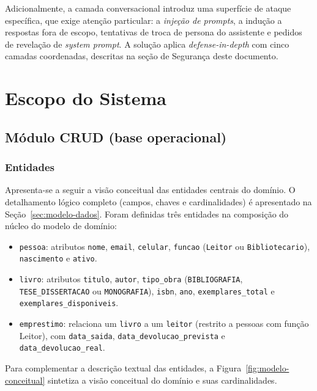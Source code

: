 \documentclass[monografia,abnt]{inf-ufg-modificado}
\begin{document}
Adicionalmente, a camada conversacional introduz uma superfície de ataque específica, que exige atenção particular: a \textit{injeção de prompts}, a indução a respostas fora de escopo, tentativas de troca de persona do assistente e pedidos de revelação de \textit{system prompt}. A solução aplica \textit{defense-in-depth} com cinco camadas coordenadas, descritas na seção de Segurança deste documento.

\chapter{Escopo do Sistema}

\section{Módulo CRUD (base operacional)}

\subsection{Entidades}

Apresenta-se a seguir a visão conceitual das entidades centrais do domínio. O detalhamento lógico completo (campos, chaves e cardinalidades) é apresentado na Seção~\ref{sec:modelo-dados}. Foram definidas três entidades na composição do núcleo do modelo de domínio:

\begin{itemize}
    \item \texttt{pessoa}: atributos \texttt{nome}, \texttt{email}, \texttt{celular}, \texttt{funcao} (\texttt{Leitor} ou \texttt{Bibliotecario}), \texttt{nascimento} e \texttt{ativo}.
    \item \texttt{livro}: atributos \texttt{titulo}, \texttt{autor}, \texttt{tipo\_obra} (\texttt{BIBLIOGRAFIA}, \texttt{TESE\_DISSERTACAO} ou \texttt{MONOGRAFIA}), \texttt{isbn}, \texttt{ano}, \texttt{exemplares\_total} e \texttt{exemplares\_disponiveis}.
    \item \texttt{emprestimo}: relaciona um \texttt{livro} a um \texttt{leitor} (restrito a pessoas com função Leitor), com \texttt{data\_saida}, \texttt{data\_devolucao\_prevista} e \texttt{data\_devolucao\_real}.
\end{itemize}

Para complementar a descrição textual das entidades, a Figura~\ref{fig:modelo-conceitual} sintetiza a visão conceitual do domínio e suas cardinalidades.
\end{document}
